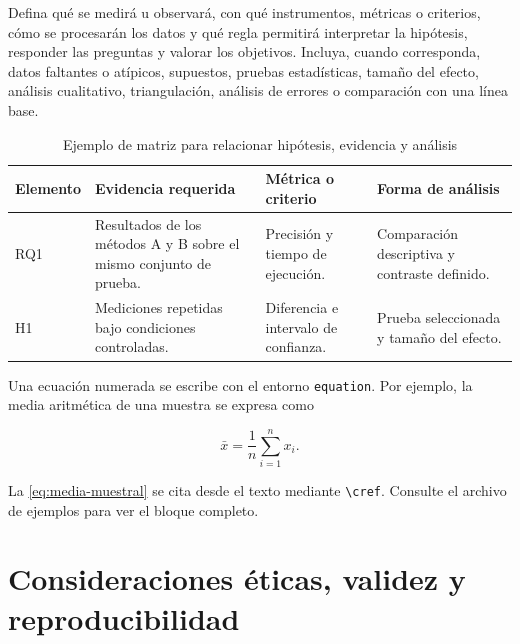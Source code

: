 Defina qué se medirá u observará, con qué instrumentos, métricas o criterios,
cómo se procesarán los datos y qué regla permitirá interpretar la hipótesis,
responder las preguntas y valorar los objetivos. Incluya, cuando corresponda,
datos faltantes o atípicos, supuestos, pruebas estadísticas, tamaño del efecto,
análisis cualitativo, triangulación, análisis de errores o comparación con una
línea base.


\ifmostrarEjemplos
\begin{table}[H]
\centering
\caption{Ejemplo de matriz para relacionar hipótesis, evidencia y análisis}
\label{tab:estrategia-evaluacion}
\small
\begin{tabularx}{\textwidth}{L{1.8cm}YYY}
\toprule
\textbf{Elemento} & \textbf{Evidencia requerida} &
\textbf{Métrica o criterio} & \textbf{Forma de análisis} \\
\midrule
RQ1 & Resultados de los métodos A y B sobre el mismo conjunto de prueba. &
Precisión y tiempo de ejecución. & Comparación descriptiva y contraste definido. \\
H1 & Mediciones repetidas bajo condiciones controladas. &
Diferencia e intervalo de confianza. & Prueba seleccionada y tamaño del efecto. \\
\bottomrule
\end{tabularx}
\end{table}

Una ecuación numerada se escribe con el entorno
\texttt{equation}. Por ejemplo, la media aritmética de una muestra se expresa
como

\begin{equation}
  \bar{x}=\frac{1}{n}\sum_{i=1}^{n}x_i.
  \label{eq:media-muestral}
\end{equation}

La \cref{eq:media-muestral} se cita desde el texto mediante
\texttt{\textbackslash cref}. Consulte el archivo de ejemplos para ver el bloque
completo.
\fi

\section{Consideraciones éticas, validez y reproducibilidad}

